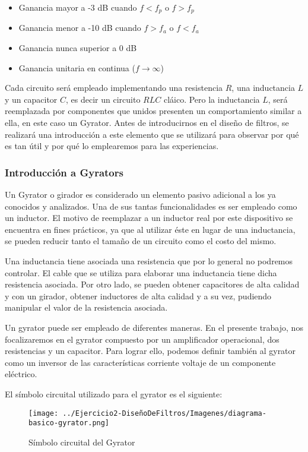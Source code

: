 \begin{itemize}
	\item Ganancia mayor a -3 dB cuando $f < f_p$ o $f > f_p$ 
	\item Ganancia menor a -10 dB cuando $f > f_a$ o $f < f_a$
	\item Ganancia nunca superior a 0 dB
	\item Ganancia unitaria en continua ($f \to \infty$)
\end{itemize}

Cada circuito será empleado implementando una resistencia $R$, una inductancia $L$ y un capacitor $C$, es decir un circuito $RLC$
cláico. Pero la inductancia $L$, será reemplazada por componentes que unidos presenten un comportamiento similar a ella, en este caso
un Gyrator. Antes de introducirnos en el diseño de filtros, se realizará una introducción a este elemento que se utilizará para observar
por qué es tan útil y por qué lo emplearemos para las experiencias.

\subsubsection{Introducción a Gyrators}

Un Gyrator o girador es considerado un elemento pasivo adicional a los ya conocidos y analizados. Una de sus tantas funcionalidades es ser empleado como un inductor. 
El motivo de reemplazar a un inductor real por este dispositivo se encuentra en fines prácticos, ya que al utilizar éste en lugar de una inductancia, se pueden reducir 
tanto el tamaño de un circuito como el costo del mismo. 

Una inductancia tiene asociada una resistencia que por lo general no podremos controlar. El cable que se utiliza para elaborar una inductancia tiene dicha resistencia asociada. 
Por otro lado, se pueden obtener capacitores de alta calidad y con un girador, obtener inductores de alta calidad y a su vez, pudiendo manipular el valor de la resistencia asociada.

Un gyrator puede ser empleado de diferentes maneras. En el presente trabajo, nos focalizaremos en el gyrator compuesto por un amplificador operacional, dos resistencias y un capacitor.
Para lograr ello, podemos definir también al gyrator como un inversor de las características corriente voltaje de un componente eléctrico.

El símbolo circuital utilizado para el gyrator es el siguiente:

\begin{figure}[H]
    \centering
    \texttt{[image: ../Ejercicio2-DiseñoDeFiltros/Imagenes/diagrama-basico-gyrator.png]}
    \caption{Símbolo circuital del Gyrator}
\end{figure}

